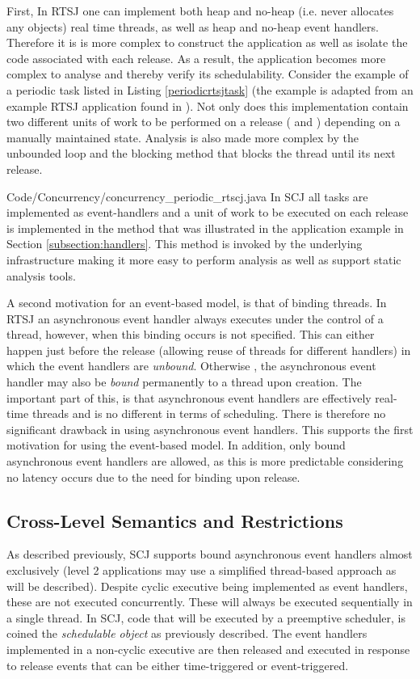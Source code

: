 First, In RTSJ one can implement both heap and no-heap (i.e. never allocates any objects) real time threads, as well as heap and no-heap event handlers. Therefore it is is more complex to construct the application as well as isolate the code associated with each release. As a result, the application becomes more complex to analyse and thereby verify its schedulability. Consider the example of a periodic task listed in Listing \ref{periodicrtsjtask} (the example is adapted from an example RTSJ application found in \cite{Schoeberl:2007:GCS:1288940.1288953}). Not only does this implementation contain two different units of work to be performed on a release ( and ) depending on a manually maintained state. Analysis is also made more complex by the unbounded loop and the blocking  method that blocks the thread until its next release.

{Code/Concurrency/concurrency_periodic_rtscj.java}
In SCJ all tasks are implemented as event-handlers and a unit of work to be executed on each release is implemented in the  method that was illustrated in the application example in Section \ref{subsection:handlers}. This method is invoked by the underlying infrastructure making it more easy to perform analysis as well as support static analysis tools.

A second motivation for an event-based model, is that of binding threads. In RTSJ an asynchronous event handler always executes under the control of a thread, however, when this binding occurs is not specified. This can either happen just before the release (allowing reuse of threads for different handlers) in which the event handlers are \textit{unbound}. Otherwise , the asynchronous event handler may also be \textit{bound} permanently to a thread upon creation. The important part of this, is that asynchronous event handlers are effectively real-time threads and is no different in terms of scheduling. There is therefore no significant drawback in using asynchronous event handlers. This supports the first motivation for using the event-based model. In addition, only bound asynchronous event handlers are allowed, as this is more predictable considering no latency occurs due to the need for binding upon release.

\subsection{Cross-Level Semantics and Restrictions} %
\label{sub:cross_level_restrictions}
As described previously, SCJ supports bound asynchronous event handlers almost exclusively (level 2 applications may use a simplified thread-based approach as will be described). Despite cyclic executive being implemented as event handlers, these are not executed concurrently. These will always be executed sequentially in a single thread.
In SCJ, code that will be executed by a preemptive scheduler, is coined the \textit{schedulable object} as previously described. The event handlers implemented in a non-cyclic executive are then released and executed in response to release events that can be either time-triggered or event-triggered. 

